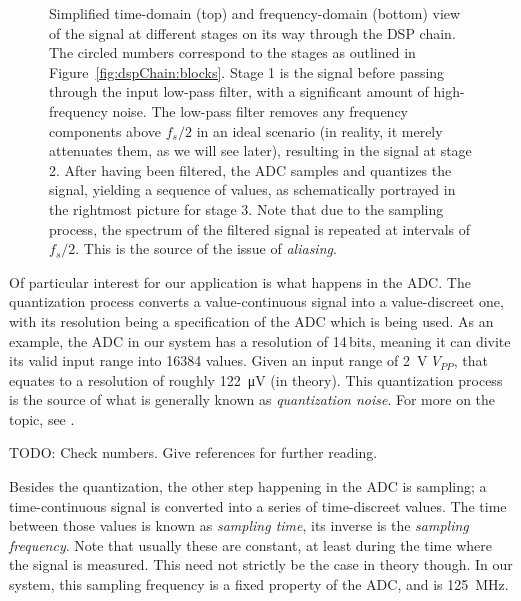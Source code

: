 \begin{figure}
    \centering
    
    
    \caption[Signals Passing Through the DSP Chain (Simplified)]{%
        Simplified  time-domain  (top)   and  frequency-domain  (bottom)  view
        of  the  signal  at  different  stages on  its  way  through  the  DSP
        chain. The circled  numbers correspond  to the  stages as  outlined in
        Figure~\ref{fig:dspChain:blocks}.\protect\newline
        Stage  1 is  the  signal  before passing  through  the input  low-pass
        filter,  with  a  significant   amount  of  high-frequency  noise. The
        low-pass filter removes any  frequency components above ${f_s}/{2}$ in
        an ideal scenario  (in reality, it merely attenuates them,  as we will
        see later), resulting in the signal at stage 2.\protect\newline
        After having been filtered, the  ADC samples and quantizes the signal,
        yielding  a sequence  of  values, as  schematically  portrayed in  the
        rightmost picture for stage 3.\protect\newline
        Note that  due to the sampling  process, the spectrum of  the filtered
        signal is repeated at intervals of  $f_s/2$. This is the source of the
        issue of \emph{aliasing}.%
    }
    \label{fig:dspChain:signals}
\end{figure}

Of particular  interest for our  application is  what happens in  the ADC. The
quantization process converts a  value-continuous signal into a value-discreet
one,  with its  resolution being  a specification  of the  ADC which  is being
used. As an example, the ADC in our system has a resolution of \num{14}\,bits,
meaning it can divite its valid  input range into \num{16384} values. Given an
input range of \SI{2}{\volt} $V_{PP}$, that equates to a resolution of roughly
\SI{122}{\micro\volt} (in theory). This quantization  process is the source of
what is generally  known as \emph{quantization noise}. For more  on the topic,
see .

TODO: Check numbers. Give references for further reading.

Besides the quantization,  the other step happening in the  ADC is sampling; a
time-continuous signal is converted into a series of time-discreet values. The
time between those values is known as \emph{sampling time}, its inverse is the
\emph{sampling  frequency}. Note that  usually  these are  constant, at  least
during the  time where the signal  is measured. This need not  strictly be the
case  in theory  though. In our  system, this  sampling frequency  is a  fixed
property of the ADC, and is \SI{125}{\mega\hertz}.


